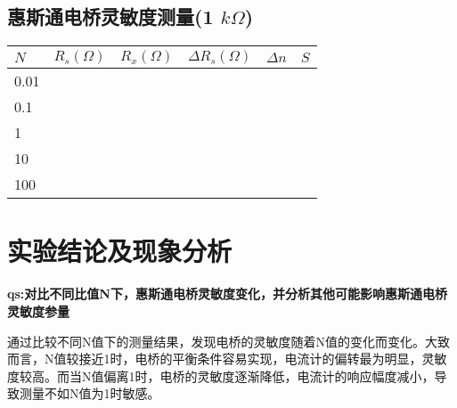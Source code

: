 \documentclass{ctexart}
\begin{document}
\subsection{惠斯通电桥灵敏度测量(1 $ k\varOmega $)}

\begin{table}[!h]
    \centering
    \renewcommand{\arraystretch}{1.5} %
    \begin{tabular}{|m{1.3cm}<{\centering}|m{1.3cm}<{\centering}|m{1.3cm}<{\centering}|m{1.3cm}<{\centering}|m{1.3cm}<{\centering}|m{1.3cm}<{\centering}|}
        \hline
        $N$ & $R_s (\varOmega)$ & $R_x (\varOmega)$ & $\Delta R_s (\varOmega)$ & $\Delta n$ & $S$ \\
        \hline
        0.01 & & & & & \\
        \hline
        0.1 & & & & & \\
        \hline
        1 & & & & & \\
        \hline
        10 & & & & & \\
        \hline
        100 & & & & & \\
        \hline
    \end{tabular}
\end{table}


\newpage

\section{实验结论及现象分析}

\textbf{qs:对比不同比值N下，惠斯通电桥灵敏度变化，并分析其他可能影响惠斯通电桥灵敏度参量}

通过比较不同N值下的测量结果，发现电桥的灵敏度随着N值的变化而变化。大致而言，N值较接近1时，电桥的平衡条件容易实现，电流计的偏转最为明显，灵敏度较高。而当N值偏离1时，电桥的灵敏度逐渐降低，电流计的响应幅度减小，导致测量不如N值为1时敏感。
\end{document}
